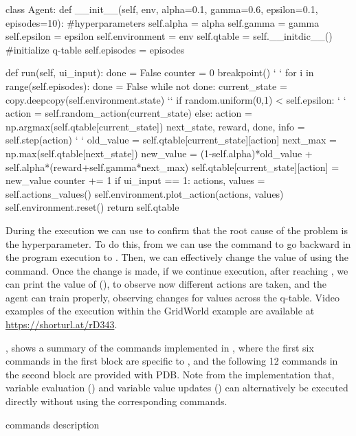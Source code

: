 \begin{python}[numbers=left,
	caption={\flik running example of the GridWorld environment},
	label={lst:gridworld-learner}]
class Agent:
  def __init__(self, env, alpha=0.1, gamma=0.6, epsilon=0.1, episodes=10):
    #hyperparameters
    self.alpha = alpha
    self.gamma = gamma
    self.epsilon = epsilon
    self.environment = env
    self.qtable = self.__initdic__() #initialize q-table
    self.episodes = episodes
    
  def run(self, ui_input):
      done = False
      counter = 0
      breakpoint()  ` \label{ln:breakpoint} `
      for i in range(self.episodes):
        done = False
        while not done:
          current_state = copy.deepcopy(self.environment.state) `\label{ln:back1}`
          if random.uniform(0,1) < self.epsilon:   ` \label{ln:stop1} `
            action = self.random_action(current_state)
          else:
            action = np.argmax(self.qtable[current_state])  
          next_state, reward, done, info = self.step(action) ` \label{ln:stop2} `
          old_value = self.qtable[current_state][action]
          next_max = np.max(self.qtable[next_state])
          new_value = (1-self.alpha)*old_value + self.alpha*(reward+self.gamma*next_max)
          self.qtable[current_state][action] = new_value
          counter += 1
        if ui_input == 1:
          actions, values = self.actions_values()
          self.environment.plot_action(actions, values)
        self.environment.reset()
    return self.qtable
\end{python}

During the execution we can use \flik to confirm that the root cause of the problem is the  
hyperparameter. To do this, from  we can use the command  to go 
backward in the program execution to . Then, we can effectively change the value of 
 using the  command. Once the change is made, if we 
continue execution, after reaching , we can print the value of  (), 
to observe now different actions are taken, and the agent can train properly, observing changes for 
values across the q-table. Video examples of the \flik execution within the GridWorld example are 
available at \url{https://shorturl.at/rD343}.

, shows a summary of the commands implemented in \flik, where the 
first six commands in the first block are specific to \flik, and the following 12 commands in the second 
block are provided with \ac{PDB}. Note from the implementation that, variable evaluation () and 
variable value updates () can alternatively be executed directly without using the 
corresponding commands.

\begin{table}
  \centering
  
  \caption{\flik commands description}
  \label{tab:flik-commands}
\end{table}


\endinput

video \url{https://drive.google.com/file/d/1NyipuWsRr6ZrIbtlvU5qyooHS2aVsWXc/view?usp=sharing}.
